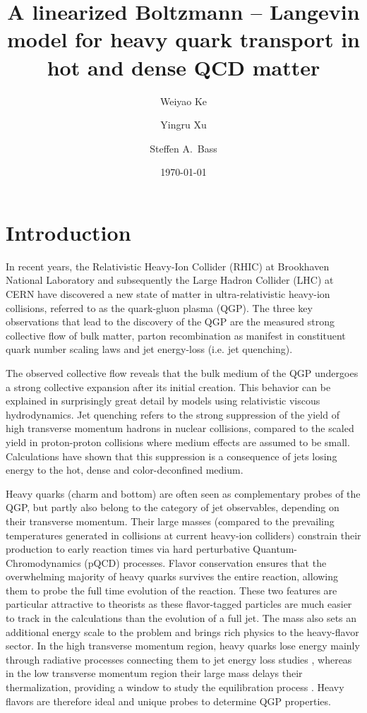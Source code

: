 \documentclass[aps, prc, reprint, amsmath, groupedaddress, nofootinbib]{revtex4-1}
\begin{document}
\title{A linearized Boltzmann -- Langevin model for heavy quark transport in hot and dense QCD matter}
\author{Weiyao Ke}
\author{Yingru Xu}
\author{Steffen A.\ Bass}
\date{\today}
\maketitle

\section{Introduction}
In recent years, the Relativistic Heavy-Ion Collider (RHIC) at Brookhaven National Laboratory and subsequently the Large Hadron Collider (LHC) at CERN have discovered a new state of matter in ultra-relativistic heavy-ion collisions, referred to as the quark-gluon plasma (QGP).
The three key observations that lead to 
the discovery of the QGP are the measured strong collective flow of bulk matter, parton recombination as manifest in constituent quark number scaling laws and jet energy-loss (i.e. jet quenching). 

The observed collective flow reveals that the bulk medium of the QGP undergoes a strong collective expansion after its initial creation.
This behavior can be explained in surprisingly great detail by models using relativistic viscous hydrodynamics.
Jet quenching refers to the strong suppression of the yield of high transverse momentum hadrons in nuclear collisions, compared to the scaled yield in proton-proton collisions where medium effects are assumed to be small.
Calculations have shown that this suppression is a consequence of jets losing energy to the hot, dense and color-deconfined medium. 

Heavy quarks (charm and bottom) are often seen as complementary probes of the QGP, but partly also belong to the category of jet observables, depending on their transverse momentum. Their large masses (compared to the prevailing temperatures generated in collisions at current heavy-ion colliders) constrain their production to early reaction times via hard perturbative Quantum-Chromodynamics (pQCD) processes. Flavor conservation ensures that the overwhelming majority of heavy quarks survives the entire reaction, allowing them to probe the full time evolution of the reaction.
These two features are particular attractive to theorists as these flavor-tagged particles are much easier to track in the calculations than the evolution of a full jet.
The mass also sets an additional energy scale to the problem and brings rich physics to the heavy-flavor sector.
In the high transverse momentum region, heavy quarks lose energy mainly through radiative processes connecting them to jet energy loss studies \cite{Wicks:2007am, Djordjevic:2004nq, Xu:2014tda, Kang:2016ofv}, whereas
in the low transverse momentum region their large mass delays their thermalization, providing a window to study the equilibration process \cite{Moore:2004tg,Riek:2010fk,Cao:2013ita}.
Heavy flavors are therefore ideal and unique probes to determine QGP properties.
\end{document}

